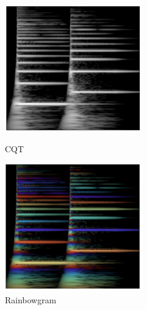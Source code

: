 \begin{figure}[b]
\centering
\begin{minipage}[b]{0.48\columnwidth}
\centering
\includegraphics[width=0.9\columnwidth]{figure/cqt.png}
\caption{CQT}
\label{fig:cqt}
\end{minipage}
\begin{minipage}[b]{0.48\columnwidth}
\centering
\includegraphics[width=0.9\columnwidth]{figure/rainbowgram.png}
\caption{Rainbowgram}
\label{fig:rainbowgram}
\end{minipage}
\end{figure}
    
